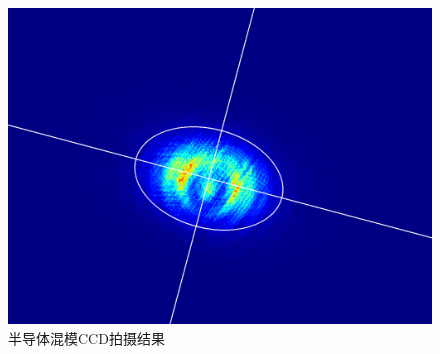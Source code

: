 \begin{figure}[H]
\begin{minipage}{0.3\textwidth}
		\includegraphics[width=\textwidth]{images/APL1_8_exp2_3_ccd}
		\caption{半导体混模CCD拍摄结果}
		\label{fig:apl18exp23ccd}
	\end{minipage}
	
	\vspace{0.3cm} %
	

\end{figure}
